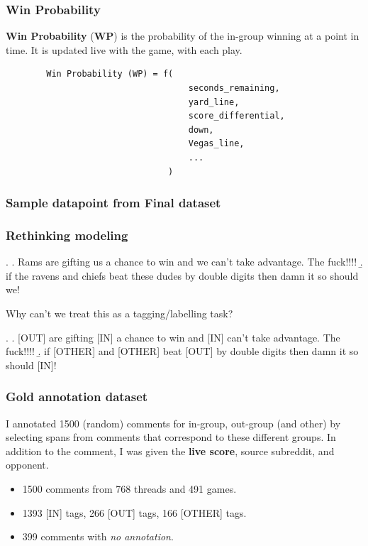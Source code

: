 \begin{frame}[c, fragile]\frametitle{Win Probability}

    \textbf{Win Probability} (\textbf{WP}) is the probability of the in-group winning at a point in time. It is updated live with the game, with each play.\pause
    
    \begin{verbatim}
        Win Probability (WP) = f(
                                    seconds_remaining,
                                    yard_line,
                                    score_differential,
                                    down,
                                    Vegas_line,
                                    ...
                                )
    \end{verbatim}

\end{frame}

\begin{frame}[c]\frametitle{Sample datapoint from Final dataset}
    

\end{frame}

\begin{frame}[c]\frametitle{Rethinking modeling}

    \ex. \a. \alert{Rams} are gifting \alert{us} a chance to win and \alert{we} can’t take advantage. The fuck!!!!
     \b. if \alert{the ravens} and \alert{chiefs} beat \alert{these dudes} by double digits then damn it so should \alert{we}!
     
    \pause Why can't we treat this as a tagging/labelling task?
    
    \ex. \a. \alert{[OUT]} are gifting \alert{[IN]} a chance to win and \alert{[IN]} can’t take advantage. The fuck!!!!
     \b. if \alert{[OTHER]} and \alert{[OTHER]} beat \alert{[OUT]} by double digits then damn it so should \alert{[IN]}!

\end{frame}

\begin{frame}[c]\frametitle{Gold annotation dataset}

I annotated 1500 (random) comments for in-group, out-group (and other) by selecting spans from comments that correspond to these different groups. In addition to the comment, I was given the \textbf{live score}, source subreddit, and opponent.

\vspace{\baselineskip}\pause

\begin{itemize}
    \itemsep=\baselineskip
    \item 1500 comments from 768 threads and 491 games.\pause
    \item 1393 [IN] tags, 266 [OUT] tags, 166 [OTHER] tags.\pause
    \item 399 comments with \emph{no annotation}.
\end{itemize}

\end{frame}

